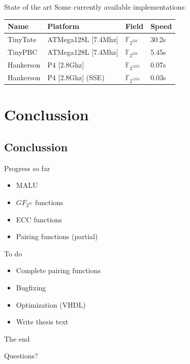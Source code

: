 \documentclass[svgnames, handout,t]{beamer}
\begin{document}
\begin{frame}{State of the art}
	Some currently available implementations:\\
	
	\begin{center}
	\begin{tabular}{llll}
		Name		&	Platform	&	Field	&	Speed\\
		\hline
		TinyTate		&	ATMega128L [7.4Mhz]	& $\mathbb{F}_{2^{256}}$	& 30.2s\\
		TinyPBC		&	ATMega128L [7.4Mhz]	& $\mathbb{F}_{2^{256}}$	& 5.45s\\
		Hankerson	&	P4 [2.8Ghz]				& $\mathbb{F}_{2^{1223}}$	& 0.07s\\
		Hankerson	&	P4 [2.8Ghz]	(SSE) 	& $\mathbb{F}_{2^{1223}}$	& 0.03s\\
		\end{tabular}
	\end{center}
\end{frame}

\section{Conclussion}
\subsection*{Conclussion}
\begin{frame}{Progress so far}
	\begin{itemize}
		\item<1-> MALU
		\item<1->	$GF_{2^m}$ functions
		\item<1-> ECC functions
		\item<1-> Pairing functions (partial)
	\end{itemize}
\end{frame}

\begin{frame}{To do}
	\begin{itemize}
		\item<1-> Complete pairing functions
		\item<1-> Bugfixing
		\item<1-> Optimization (VHDL)
		\item<1-> Write thesis text
	\end{itemize}
\end{frame}

\begin{frame}{The end}
	\begin{center}\LARGE Questions?\end{center}
\end{frame}
\end{document}
